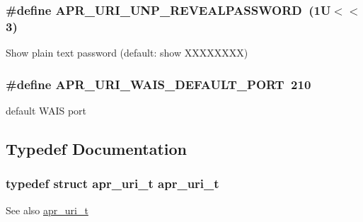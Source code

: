 \subsubsection[{\texorpdfstring{A\+P\+R\+\_\+\+U\+R\+I\+\_\+\+U\+N\+P\+\_\+\+R\+E\+V\+E\+A\+L\+P\+A\+S\+S\+W\+O\+RD}{APR_URI_UNP_REVEALPASSWORD}}]{\setlength{\rightskip}{0pt plus 5cm}\#define A\+P\+R\+\_\+\+U\+R\+I\+\_\+\+U\+N\+P\+\_\+\+R\+E\+V\+E\+A\+L\+P\+A\+S\+S\+W\+O\+RD~(1\+U$<$$<$3)}\hypertarget{group__APR__Util__URI_ga527cd70521f12a7962df9976068dda29}{}\label{group__APR__Util__URI_ga527cd70521f12a7962df9976068dda29}
Show plain text password (default\+: show X\+X\+X\+X\+X\+X\+XX) 
\subsubsection[{\texorpdfstring{A\+P\+R\+\_\+\+U\+R\+I\+\_\+\+W\+A\+I\+S\+\_\+\+D\+E\+F\+A\+U\+L\+T\+\_\+\+P\+O\+RT}{APR_URI_WAIS_DEFAULT_PORT}}]{\setlength{\rightskip}{0pt plus 5cm}\#define A\+P\+R\+\_\+\+U\+R\+I\+\_\+\+W\+A\+I\+S\+\_\+\+D\+E\+F\+A\+U\+L\+T\+\_\+\+P\+O\+RT~210}\hypertarget{group__APR__Util__URI_ga0807570c6ef5c3813f65915fb0c19ff2}{}\label{group__APR__Util__URI_ga0807570c6ef5c3813f65915fb0c19ff2}
default W\+A\+IS port 

\subsection{Typedef Documentation}
\subsubsection[{\texorpdfstring{apr\+\_\+uri\+\_\+t}{apr_uri_t}}]{\setlength{\rightskip}{0pt plus 5cm}typedef struct {\bf apr\+\_\+uri\+\_\+t} {\bf apr\+\_\+uri\+\_\+t}}\hypertarget{group__APR__Util__URI_ga44e5978712bd6ff4fb65314346c01392}{}\label{group__APR__Util__URI_ga44e5978712bd6ff4fb65314346c01392}
\begin{DoxySeeAlso}{See also}
\hyperlink{structapr__uri__t}{apr\+\_\+uri\+\_\+t} 
\end{DoxySeeAlso}


